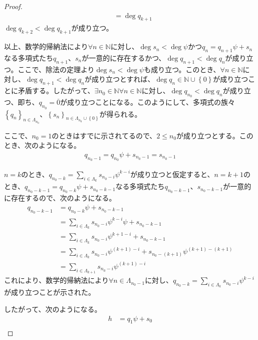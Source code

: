 \documentclass[dvipdfmx]{jsarticle}
\begin{document}
\begin{proof}
\begin{align*}
&= \deg q_{k + 1}
\end{align*}
$\deg q_{k + 2} < \deg q_{k + 1}$が成り立つ。\par
以上、数学的帰納法により$\forall n \in \mathbb{N}$に対し、$\deg s_{n} < \deg\psi$かつ$q_{n} = q_{n + 1}\psi + s_{n}$なる多項式たち$q_{n + 1}$、$s_{n}$が一意的に存在するかつ、$\deg q_{n + 1} < \deg q_{n}$が成り立つ。ここで、除法の定理より$\deg s_{n} < \deg\psi$も成り立つ。このとき、$\forall n \in \mathbb{N}$に対し、$\deg q_{n + 1} < \deg q_{n}$が成り立つとすれば、$\deg q_{n} \in \mathbb{N} \cup \left\{ 0 \right\}$が成り立つことに矛盾する。したがって、$\exists n_{0} \in \mathbb{N}\forall n \in \mathbb{N}$に対し、$\deg q_{n_{0}} < \deg q_{n}$が成り立つ、即ち、$q_{n_{0}} = \overline{0}$が成り立つことになる。このようにして、多項式の族々$\left\{ q_{n} \right\}_{n \in \varLambda_{n_{0}}}$、$\left\{ s_{n} \right\}_{n \in \varLambda_{n_{0}} \cup \left\{ 0 \right\}}$が得られる。\par
ここで、$n_{0} = 1$のときはすでに示されてるので、$2 \leq n_{0}$が成り立つとする。このとき、次のようになる。
\begin{align*}
q_{n_{0} - 1} = q_{n_{0}}\psi + s_{n_{0} - 1} = s_{n_{0} - 1}
\end{align*}\par
$n = k$のとき、$q_{n_{0} - k} = \sum_{i \in \varLambda_{k}} {s_{n_{0} - i}\psi^{k - i}}$が成り立つと仮定すると、$n = k + 1$のとき、$q_{n_{0} - k - 1} = q_{n_{0} - k}\psi + s_{n_{0} - k - 1}$なる多項式たち$q_{n_{0} - k - 1}$、$s_{n_{0} - k - 1}$が一意的に存在するので、次のようになる。
\begin{align*}
q_{n_{0} - k - 1} &= q_{n_{0} - k}\psi + s_{n_{0} - k - 1}\\
&= \sum_{i \in \varLambda_{k}} {s_{n_{0} - i}\psi^{k - i}}\psi + s_{n_{0} - k - 1}\\
&= \sum_{i \in \varLambda_{k}} {s_{n_{0} - i}\psi^{k + 1 - i}} + s_{n_{0} - k - 1}\\
&= \sum_{i \in \varLambda_{k}} {s_{n_{0} - i}\psi^{(k + 1) - i}} + s_{n_{0} - (k + 1)}\psi^{(k + 1) - (k + 1)}\\
&= \sum_{i \in \varLambda_{k + 1}} {s_{n_{0} - i}\psi^{(k + 1) - i}}
\end{align*}
これにより、数学的帰納法により$\forall n \in \varLambda_{n_{0} - 1}$に対し、$q_{n_{0} - k} = \sum_{i \in \varLambda_{k}} {s_{n_{0} - i}\psi^{k - i}}$が成り立つことが示された。\par
したがって、次のようになる。
\begin{align*}
h &= q_{1}\psi + s_{0}\\

\end{align*}
\end{proof}
\end{document}
